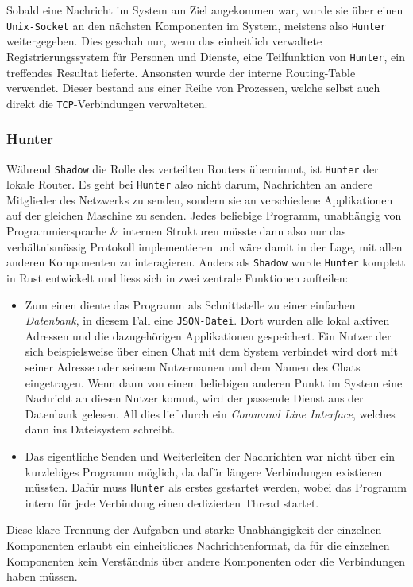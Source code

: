 \documentclass[11pt]{article}
\begin{document}
\noindent Sobald eine Nachricht im System am Ziel angekommen war,
wurde sie über einen \texttt{Unix-Socket} an den nächsten Komponenten im
System, meistens also \texttt{Hunter} weitergegeben. Dies geschah nur, wenn das
einheitlich verwaltete Registrierungssystem für Personen und Dienste,
eine Teilfunktion von \texttt{Hunter}, ein treffendes Resultat lieferte.
Ansonsten wurde der interne Routing-Table verwendet. Dieser bestand
aus einer Reihe von Prozessen, welche selbst auch direkt die
\texttt{TCP}-Verbindungen verwalteten. 
\subsubsection{Hunter}
\label{sec:orgc458617}
Während \texttt{Shadow} die Rolle des verteilten Routers übernimmt, ist \texttt{Hunter}
der lokale Router. Es geht bei \texttt{Hunter} also nicht darum, Nachrichten an
andere Mitglieder des Netzwerks zu senden, sondern sie an verschiedene
Applikationen auf der gleichen Maschine zu senden. Jedes beliebige
Programm, unabhängig von Programmiersprache \& internen Strukturen
müsste dann also nur das verhältnismässig Protokoll implementieren und
wäre damit in der Lage, mit allen anderen Komponenten zu interagieren.
Anders als \texttt{Shadow} wurde \texttt{Hunter} komplett in Rust entwickelt und liess
sich in zwei zentrale Funktionen aufteilen:
\begin{itemize}
\item Zum einen diente das Programm als Schnittstelle zu einer einfachen
\emph{Datenbank}, in diesem Fall eine \texttt{JSON-Datei}. Dort wurden alle lokal
aktiven Adressen und die dazugehörigen Applikationen gespeichert.
Ein Nutzer der sich beispielsweise über einen Chat mit dem System
verbindet wird dort mit seiner Adresse oder seinem Nutzernamen und
dem Namen des Chats eingetragen. Wenn dann von einem beliebigen
anderen Punkt im System eine Nachricht an diesen Nutzer kommt, wird
der passende Dienst aus der Datenbank gelesen. All dies lief durch
ein \emph{Command Line Interface}, welches dann ins Dateisystem schreibt.
\item Das eigentliche Senden und Weiterleiten der Nachrichten war nicht
über ein kurzlebiges Programm möglich, da dafür längere Verbindungen
existieren müssten. Dafür muss \texttt{Hunter} als erstes gestartet werden,
wobei das Programm intern für jede Verbindung einen dedizierten
Thread startet.
\end{itemize}

Diese klare Trennung der Aufgaben und starke Unabhängigkeit der
einzelnen Komponenten erlaubt ein einheitliches Nachrichtenformat, da
für die einzelnen Komponenten kein Verständnis über andere Komponenten
oder die Verbindungen haben müssen. 
\end{document}
